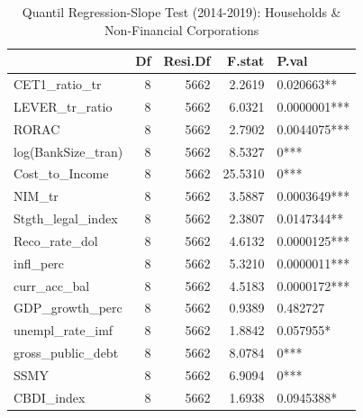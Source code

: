 \begin{table}[ht]
\centering
\caption{Quantil Regression-Slope Test (2014-2019): Households & Non-Financial Corporations} 
\label{slope.hh.nfi}
\begingroup\small
\begin{tabular}{lrrrl}
  \toprule
 & Df & Resi.Df & F.stat & P.val \\ 
  \midrule
CET1\_ratio\_tr & 8 & 5662 & 2.2619 & 0.020663** \\ 
  LEVER\_tr\_ratio & 8 & 5662 & 6.0321 & 0.0000001*** \\ 
  RORAC & 8 & 5662 & 2.7902 & 0.0044075*** \\ 
  log(BankSize\_tran) & 8 & 5662 & 8.5327 & 0*** \\ 
  Cost\_to\_Income & 8 & 5662 & 25.5310 & 0*** \\ 
  NIM\_tr & 8 & 5662 & 3.5887 & 0.0003649*** \\ 
  Stgth\_legal\_index & 8 & 5662 & 2.3807 & 0.0147344** \\ 
  Reco\_rate\_dol & 8 & 5662 & 4.6132 & 0.0000125*** \\ 
  infl\_perc & 8 & 5662 & 5.3210 & 0.0000011*** \\ 
  curr\_acc\_bal & 8 & 5662 & 4.5183 & 0.0000172*** \\ 
  GDP\_growth\_perc & 8 & 5662 & 0.9389 & 0.482727 \\ 
  unempl\_rate\_imf & 8 & 5662 & 1.8842 & 0.057955* \\ 
  gross\_public\_debt & 8 & 5662 & 8.0784 & 0*** \\ 
  SSMY & 8 & 5662 & 6.9094 & 0*** \\ 
  CBDI\_index & 8 & 5662 & 1.6938 & 0.0945388* \\ 
   \bottomrule
\end{tabular}
\endgroup
\end{table}
